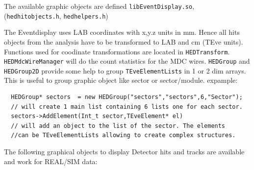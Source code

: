 The available graphic objects are defined
\verb+libEventDisplay.so+, (\verb+hedhitobjects.h+,
\newline
\verb+hedhelpers.h+)

The Eventdisplay uses LAB coordinates with x,y.z units 
in mm. Hence all hits objects from the analysis have to be
transformed to LAB and cm (TEve units). Functions used 
for coodinate transformations are located in \verb+HEDTransform+. 
\verb+HEDMdcWireManager+ will do the count statistics for 
the MDC wires. \verb+HEDGroup+ and \verb+HEDGroup2D+ 
provide some help to group
\verb+TEveElementLists+ in 1 or 2 dim arrays. This is useful
to group graphic object like sector or sector/module.
expample:
\begin{lstlisting}
  HEDGroup* sectors  = new HEDGroup("sectors","sectors",6,"Sector");
  // will create 1 main list containing 6 lists one for each sector.
  sectors->AddElement(Int_t sector,TEveElement* el)
  // will add an object to the list of the sector. The elements
  //can be TEveElementLists allowing to create complex structures.
\end{lstlisting}

The following graphical objects to display Detector hits
and tracks are available and work for REAL/SIM data:


